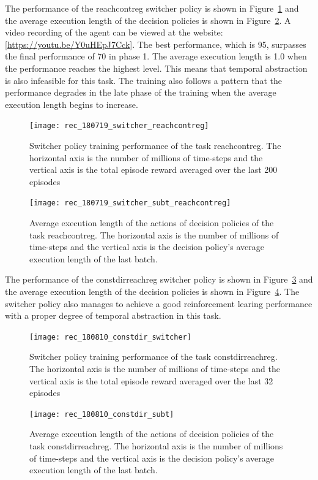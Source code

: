 The performance of the reachcontreg switcher policy is shown in Figure~\ref{rec_switcher_reachcontreg} and the average execution length of the decision policies is shown in Figure~\ref{rec_switcher_subt_reachcontreg}. A video recording of the agent can be viewed at the website:  [\url{https://youtu.be/Y0uHEpJ7Cck}]. The best performance, which is 95, surpasses the final performance of 70 in phase 1. The average execution length is 1.0 when the performance reaches the highest level. This means that temporal abstraction is also infeasible for this task. The training also follows a pattern that the performance degrades in the late phase of the training when the average execution length begins to increase.
\begin{figure}[!htbp]
	\centering
	\texttt{[image: rec\_180719\_switcher\_reachcontreg]}
	\caption{Switcher policy training performance of the task reachcontreg. The horizontal axis is the number of millions of time-steps and the vertical axis is the total episode reward averaged over the last 200 episodes}
	\label{rec_switcher_reachcontreg}
\end{figure}

\begin{figure}[!htbp]
	\centering
	\texttt{[image: rec\_180719\_switcher\_subt\_reachcontreg]}
	\caption{Average execution length of the actions of decision policies of the task reachcontreg. The horizontal axis is the number of millions of time-steps and the vertical axis is the decision policy's average execution length of the last batch.}
	\label{rec_switcher_subt_reachcontreg}
\end{figure}

The performance of the constdirreachreg switcher policy is shown in Figure~\ref{rec_switcher_constdir} and the average execution length of the decision policies is shown in Figure~\ref{rec_switcher_subt_constdir}. The switcher policy also manages to achieve a good reinforcement learing performance with a proper degree of temporal abstraction in this task.

\begin{figure}[!htbp]
	\centering
	\texttt{[image: rec\_180810\_constdir\_switcher]}
	\caption{Switcher policy training performance of the task constdirreachreg. The horizontal axis is the number of millions of time-steps and the vertical axis is the total episode reward averaged over the last 32 episodes}
	\label{rec_switcher_constdir}
\end{figure}

\begin{figure}[!htbp]
	\centering
	\texttt{[image: rec\_180810\_constdir\_subt]}
	\caption{Average execution length of the actions of decision policies of the task constdirreachreg. The horizontal axis is the number of millions of time-steps and the vertical axis is the decision policy's average execution length of the last batch.}
	\label{rec_switcher_subt_constdir}
\end{figure}


